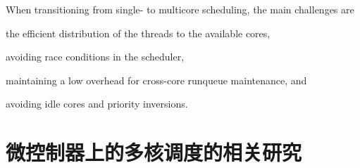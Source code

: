 When transitioning from single- to multicore scheduling, the main challenges are
\begin{enumerate*}[label=(\roman*)]
\item the efficient distribution of the threads to the available cores, 
\item avoiding race conditions in the scheduler, 
\item maintaining a low overhead for cross-core runqueue maintenance, and 
\item avoiding idle cores and priority inversions.
\end{enumerate*}




\fi

\section{微控制器上的多核调度的相关研究} \label{sec:multicore-sched}



